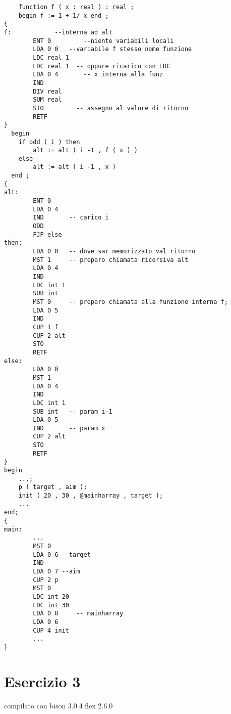 \documentclass[a4paper,oneside,11pt]{article}
\begin{document}
\begin{lstlisting}
    function f ( x : real ) : real ;
    begin f := 1 + 1/ x end ;
{ 
f:		      --interna ad alt
		ENT 0		  --niente variabili locali
		LDA 0 0	  --variabile f stesso nome funzione
		LDC real 1
		LDC real 1  -- oppure ricarico con LDC
		LDA 0 4  	  -- x interna alla funz
		IND
		DIV real
		SUM real
		STO         -- assegno al valore di ritorno
		RETF
}
  begin
	if odd ( i ) then
		alt := alt ( i -1 , f ( x ) )
	else
		alt := alt ( i -1 , x )
  end ;
{
alt:
		ENT 0
		LDA 0 4
		IND       -- carico i
		ODD
		FJP else
then:
		LDA 0 0   -- dove sar memorizzato val ritorno
		MST 1     -- preparo chiamata ricorsiva alt
		LDA 0 4
		IND
		LDC int 1
		SUB int
		MST 0     -- preparo chiamata alla funzione interna f;
		LDA 0 5
		IND
		CUP 1 f
		CUP 2 alt
		STO
		RETF
else:
		LDA 0 0
		MST 1
		LDA 0 4
		IND
		LDC int 1
		SUB int   -- param i-1
		LDA 0 5
		IND       -- param x
		CUP 2 alt
		STO
		RETF
}
begin
	...;
	p ( target , aim );
	init ( 20 , 30 , @mainharray , target );
	...
end;
{
main:
		...
		MST 0     
		LDA 0 6	--target
		IND
		LDA 0 7	--aim
		CUP 2 p
		MST 0       
		LDC int 20
		LDC int 30
		LDA 0 8     -- mainharray 
		LDA 0 6	
		CUP 4 init
		...
}
\end{lstlisting}	
\section*{Esercizio 3}
compilato con bison 3.0.4
flex 2.6.0
\end{document}
